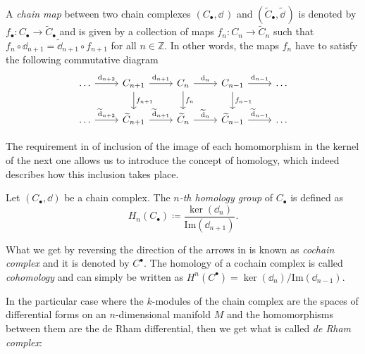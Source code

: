 \begin{definition}
\label{def:chain_map}
    A \emph{chain map} between two chain complexes $(C_\bullet, \dd \,)$ and $(\widetilde{C}_\bullet, \widetilde{\dd} \,)$ is denoted by $f_\bullet : C_\bullet \rightarrow \widetilde{C}_\bullet$ and is given by a collection of maps $f_n : C_n \rightarrow \widetilde{C}_n$ such that
    $f_n \circ \dd_{n+1} = \widetilde{\dd}_{n+1} \circ f_{n+1}$ for all $n \in \mathbb{Z}$.
    In other words, the maps $f_n$ have to satisfy the following commutative diagram
    \begin{equation*}
        \begin{tikzcd}
            \ldots \arrow[r, "\dd_{n+2}"] &
            C_{n+1} \arrow[r, "\dd_{n+1}"] \arrow[d, "f_{n+1}"] &
            C_{n} \arrow[r, "\dd_{n}"] \arrow[d, "f_{n}"] &
            C_{n-1} \arrow[r, "\dd_{n-1}"] \arrow[d, "f_{n-1}"] & \ldots \\
            \ldots \arrow[r, "\widetilde{\dd}_{n+2}"] &
            \widetilde{C}_{n+1} \arrow[r, "\widetilde{\dd}_{n+1}"] &
            \widetilde{C}_{n} \arrow[r, "\widetilde{\dd}_{n}"] &
            \widetilde{C}_{n-1} \arrow[r, "\widetilde{\dd}_{n-1}"] & \ldots
    \end{tikzcd}
    \end{equation*}
\end{definition}

The requirement in  of inclusion of the image of each homomorphism in the kernel of the next one allows us to introduce the concept of homology, which indeed describes how this inclusion takes place.

\begin{definition}
\label{def:homology}
    Let $(C_{\bullet}, \dd )$ be a chain complex.
    The \emph{$n$-th homology group} of $C_{\bullet}$ is defined as
    \begin{equation*}
        H_n (C_\bullet) \coloneqq \frac{\ker (\dd_n)}{\text{Im} (\dd_{n+1})}.
    \end{equation*}
\end{definition}

What we get by reversing the direction of the arrows in  is known as \emph{cochain complex} and it is denoted by $C^\bullet$.
The homology of a cochain complex is called \emph{cohomology} and can simply be written as $H^n (C^\bullet) = {\ker (\dd_n)} / {\text{Im} (\dd_{n-1})}$.

In the particular case where the $k$-modules of the chain complex are the spaces of differential forms on an $n$-dimensional manifold $M$ and the homomorphisms between them are the de Rham differential, then we get what is called \emph{de Rham complex}:

